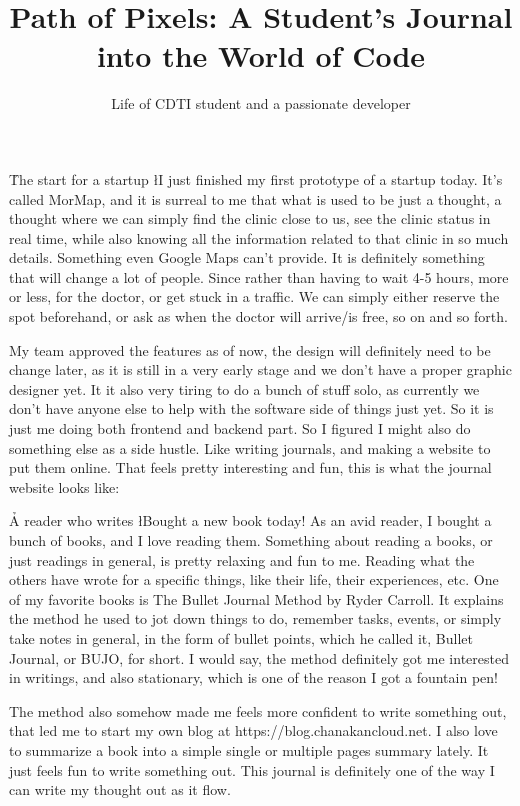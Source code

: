 \documentclass{novella}
\title     {Path of Pixels: A Student's Journal into the World of Code}
\subtitle  {Life of CDTI student and a passionate developer}
\begin{document}
\h{The start for a startup}
\l{I} just finished my first prototype of a startup today. It's called MorMap, and it is surreal to me that what is used to be just a thought, a thought where we can simply find the clinic close to us, see the clinic status in real time, while also knowing all the information related to that clinic in so much details. Something even Google Maps can't provide. It is definitely something that will change a lot of people. Since rather than having to wait 4-5 hours, more or less, for the doctor, or get stuck in a traffic. We can simply either reserve the spot beforehand, or ask as when the doctor will arrive/is free, so on and so forth.

My team approved the features as of now, the design will definitely need to be change later, as it is still in a very early stage and we don't have a proper graphic designer yet. It it also very tiring to do a bunch of stuff solo, as currently we don't have anyone else to help with the software side of things just yet. So it is just me doing both frontend and backend part. So I figured I might also do something else as a side hustle. Like writing journals, and making a website to put them online. That feels pretty interesting and fun, this is what the journal website looks like:


\h{A reader who writes}
\l{B}ought a new book today! As an avid reader, I bought a bunch of books, and I love reading them. Something about reading a books, or just readings in general, is pretty relaxing and fun to me. Reading what the others have wrote for a specific things, like their life, their experiences, etc. One of my favorite books is The Bullet Journal Method by Ryder Carroll. It explains the method he used to jot down things to do, remember tasks, events, or simply take notes in general, in the form of bullet points, which he called it,  Bullet Journal, or BUJO, for short. I would say, the method definitely got me interested in writings, and also stationary, which is one of the reason I got a fountain pen!

The method also somehow made me feels more confident to write something out, that led me to start my own blog at https://blog.chanakancloud.net. I also love to summarize a book into a simple single or multiple pages summary lately. It just feels fun to write something out. This journal is definitely one of the way I can write my thought out as it flow.
\end{document}
